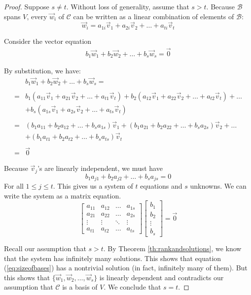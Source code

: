 \documentclass{ximera}
\begin{document}
\begin{proof}
Suppose $s\neq t$.  Without loss of generality, assume that $s>t$.  Because $\mathcal{B}$ spans $V$, every $\vec{w}_i$ of $\mathcal{C}$ can be written as a linear combination of elements of $\mathcal{B}$:
$$\vec{w}_i=a_{1i}\vec{v}_1+a_{2i}\vec{v}_{2}+\ldots +a_{ti}\vec{v}_t$$

Consider the vector equation
\begin{align}\label{eq:sizeofbases}
b_1\vec{w}_1+b_2\vec{w}_2+\ldots +b_s\vec{w}_s=\vec{0}
\end{align}

By substitution, we have:
\begin{align*}
    &b_1\vec{w}_1+b_2\vec{w}_2+\ldots +b_s\vec{w}_s=\\ \\
     =&b_1(a_{11}\vec{v}_1+a_{21}\vec{v}_{2}+\ldots +a_{t1}\vec{v}_t)+b_2(a_{12}\vec{v}_1+a_{22}\vec{v}_{2}+\ldots +a_{t2}\vec{v}_t)+\ldots\\
     &+b_s(a_{1s}\vec{v}_1+a_{2s}\vec{v}_{2}+\ldots +a_{ts}\vec{v}_t)\\ \\
     =&(b_1a_{11}+b_2a_{12}+\ldots +b_sa_{1s})\vec{v}_1
+(b_1a_{21}+b_2a_{22}+\ldots +b_sa_{2s})\vec{v}_2+
\ldots \\
&+(b_1a_{t1}+b_2a_{t2}+\ldots +b_sa_{ts})\vec{v}_t\\ \\
=&\vec{0}
\end{align*}

Because $\vec{v}_j$'s are linearly independent, we must have
$$b_1a_{j1}+b_2a_{j2}+\ldots +b_sa_{js}=0$$
For all $1\leq j\leq t$.
This gives us a system of $t$ equations and $s$ unknowns.  We can write the system as a matrix equation.
$$\begin{bmatrix}a_{11}&a_{12}&\ldots &a_{1s}\\a_{21}&a_{22}&\ldots &a_{2s}\\\vdots&\vdots&\ddots&\vdots\\a_{t1}&a_{t2}&\ldots&a_{ts}\end{bmatrix}\begin{bmatrix}b_1\\b_2\\\vdots\\b_s\end{bmatrix}=\vec{0}$$

Recall our assumption that $s>t$.  By Theorem \ref{th:rankandsolutions}, we know that the system has infinitely many solutions.  This shows that equation (\ref{eq:sizeofbases}) has a nontrivial solution (in fact, infinitely many of them).  But this shows that $\{\vec{w}_1, \vec{w}_2,\ldots ,\vec{w}_s\}$ is linearly dependent and contradicts our assumption that $\mathcal{C}$ is a basis of $V$.  We conclude that $s=t$.
\end{proof}
\end{document}
